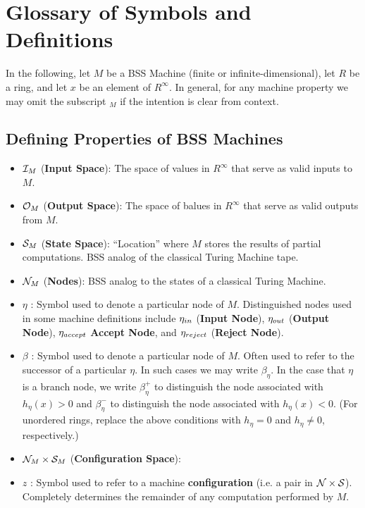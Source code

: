 \chapter{Glossary of Symbols and Definitions}

In the following, let $M$ be a BSS Machine (finite or
infinite-dimensional), let $R$ be a ring, and let $x$ be an element of
$R^\infty$. In general, for any machine property we may omit the
subscript $_M$ if the intention is clear from context.

\section{Defining Properties of BSS Machines}
\begin{itemize}
\item $\mathcal{I}_M$ (\textbf{Input Space}): The space of values in
  $R^\infty$ that serve as valid inputs to $M$.
\item $\mathcal{O}_M$ (\textbf{Output Space}): The space of balues in
  $R^\infty$ that serve as valid outputs from $M$.
\item $\mathcal{S}_M$ (\textbf{State Space}): ``Location'' where $M$
  stores the results of partial computations. BSS analog of the
  classical Turing Machine tape.
\item $\mathcal{N}_M$ (\textbf{Nodes}): BSS analog to the states of a
  classical Turing Machine.
\item $\eta$ : Symbol used to denote a particular node of $M$.
  Distinguished nodes used in some machine definitions include
  $\eta_{in}$ (\textbf{Input Node}), $\eta_{out}$ (\textbf{Output
    Node}), $\eta_{accept}$ \textbf{Accept Node}, and $\eta_{reject}$
  (\textbf{Reject Node}).
\item $\beta$ : Symbol used to denote a particular node of $M$.
  Often used to refer to the successor of a particular $\eta$.  In
  such cases we may write $\beta_\eta$.  In the case that $\eta$ is
  a branch node, we write $\beta_\eta^+$ to distinguish the node
  associated with $h_\eta(x) > 0$ and $\beta_\eta^-$ to distinguish
  the node associated with $h_\eta(x) < 0$. (For unordered rings,
  replace the above conditions with $h_\eta = 0$ and $h_\eta \neq
  0$, respectively.)
\item $\mathcal{N}_M \times \mathcal{S}_M$ (\textbf{Configuration Space}):
\item $z$ : Symbol used to refer to a machine \textbf{configuration}
  (i.e. a pair in $\mathcal{N} \times \mathcal{S}$).  Completely determines the remainder
  of any computation performed by $M$.
\end{itemize}
